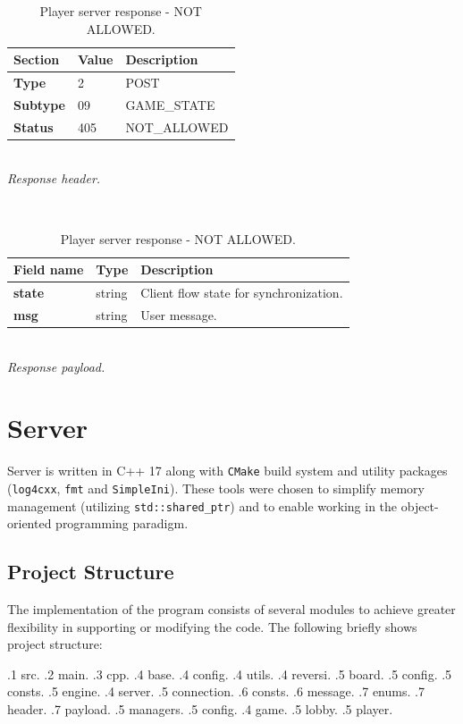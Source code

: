 \documentclass[english, sem, kiv, he, iso690alph, pdf, viewonly]{fasthesis}
\begin{document}
\begin{table}[h!]
	\centering
	\begin{minipage}[b]{1.0\textwidth}
		\centering
		\begin{tabular}{|l|l|l|}
			\hline
			\textbf{Section} & \textbf{Value} & \textbf{Description} \\ \hline
			\textbf{Type} & 2 & \footnotesize{POST} \\ \hline
			\textbf{Subtype} & 09 & \footnotesize{GAME\_STATE}  \\ \hline
			\textbf{Status} & 405 & \footnotesize{NOT\_ALLOWED} \\ \hline
		\end{tabular} \\
		\textit{Response header.}
	\end{minipage}
	\\
	\vspace{10pt}
	\begin{minipage}[b]{1.0\textwidth}
		\centering
		\begin{tabular}{|l|l|l|}
			\hline
			\textbf{Field name} & \textbf{Type} & \textbf{Description} \\ \hline
			\textbf{state} & string & Client flow state for synchronization. \\ \hline
            \textbf{msg} & string & User message. \\ \hline
		\end{tabular} \\
		\textit{Response payload.}
	\end{minipage}	
	\caption{Player server response - NOT ALLOWED.}
	\label{tab:player_move_response__not_allowed}
\end{table}
\newpage

\chapter{Server}

Server is written in C++ 17 along with \texttt{CMake} build system and utility packages (\texttt{log4cxx}, \texttt{fmt} and \texttt{SimpleIni}). These tools were chosen to simplify memory management (utilizing \texttt{std::shared\_ptr}) and to enable working in the object-oriented programming paradigm.

\newpage
\section{Project Structure}
The implementation of the program consists of several modules to achieve greater flexibility in supporting or modifying the code. The following briefly shows project structure:
\\
\begin{dirtree}{%
	.1 src.
	.2 main.
	.3 cpp.
	.4 base.
	.4 config.
	.4 utils.
	.4 reversi.
	.5 board.
	.5 config.
	.5 consts.
	.5 engine.
	.4 server.
	.5 connection.
	.6 consts.
	.6 message.
	.7 enums.
	.7 header.
	.7 payload.
	.5 managers.
	.5 config.
	.4 game.
	.5 lobby.
	.5 player.
	}
\end{dirtree}
\end{document}
